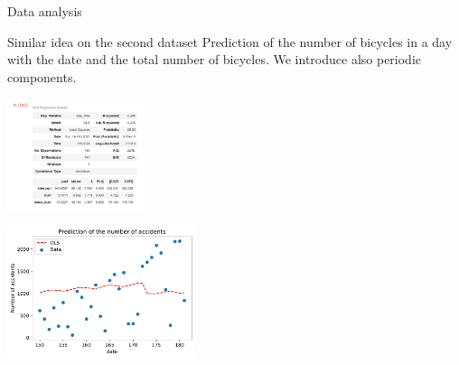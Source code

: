 \documentclass[unknownkeysallowed]{beamer}
\begin{document}
\begin{frame}{Data analysis}

\begin{block}{Similar idea on the second dataset}
Prediction of the number of bicycles in a day with the date and the total number of bicycles. We introduce also periodic components.
\end{block}


\begin{minipage}[c]{.36\linewidth}
     \begin{center}
             \includegraphics[width=4cm]{stat_model_albert}
         \end{center}
   \end{minipage} \hfill
   \begin{minipage}[c]{.55\linewidth}
    \begin{center}
            \includegraphics[width=5.5cm]{accidentpredictionalbert1}
            
        \end{center}
        
 \end{minipage}



    
\end{frame}











\end{document}

